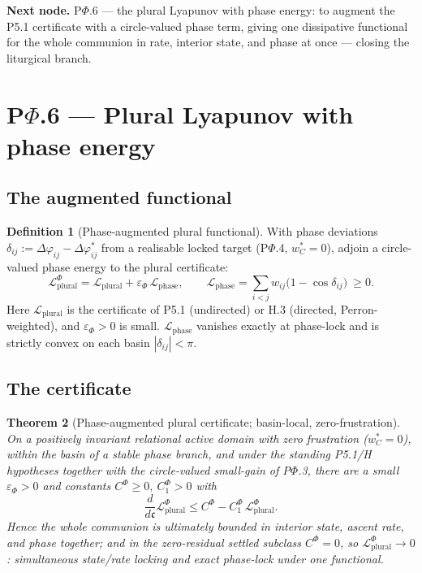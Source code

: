 \documentclass[11pt,a4paper]{article}
\newcommand{\cint}{\ensuremath{\mathfrak c}}
\theoremstyle{definition}
\newtheorem{definition}{Definition}[section]
\theoremstyle{plain}
\newtheorem{theorem}[definition]{Theorem}
\theoremstyle{remark}
\begin{document}
\medskip
\textbf{Next node.} P$\Phi$.6 --- the plural Lyapunov with phase energy: to augment the P5.1
certificate with a circle-valued phase term, giving one dissipative functional for the whole
communion in rate, interior state, and phase at once --- closing the liturgical branch.

\section{P$\Phi$.6 --- Plural Lyapunov with phase energy}

\subsection{The augmented functional}

\begin{definition}[Phase-augmented plural functional]\label{def:phaselyap}
With phase deviations \(\delta_{ij}:=\Delta\varphi_{ij}-\Delta\varphi_{ij}^{*}\) from a
realisable locked target (P$\Phi$.4, \(w_C^{*}=0\)), adjoin a circle-valued phase energy to the
plural certificate:
\[
\boxed{\;
\mathcal L_{\mathrm{plural}}^{\Phi}
=
\mathcal L_{\mathrm{plural}}
+
\varepsilon_\Phi\,\mathcal L_{\mathrm{phase}},
\qquad
\mathcal L_{\mathrm{phase}}
=
\sum_{i<j} w_{ij}\bigl(1-\cos\delta_{ij}\bigr)\ \ge 0 .
\;}
\]
Here \(\mathcal L_{\mathrm{plural}}\) is the certificate of P5.1 (undirected) or H.3 (directed,
Perron-weighted), and \(\varepsilon_\Phi>0\) is small. \(\mathcal L_{\mathrm{phase}}\) vanishes
exactly at phase-lock and is strictly convex on each basin \(|\delta_{ij}|<\pi\).
\end{definition}

\subsection{The certificate}

\begin{theorem}[Phase-augmented plural certificate; basin-local, zero-frustration]\label{thm:phaselyap}
On a positively invariant relational active domain with zero frustration
(\(w_C^{*}=0\)), within the basin of a stable phase branch, and under the standing P5.1/H
hypotheses together with the circle-valued small-gain of P$\Phi$.3, there are a small
\(\varepsilon_\Phi>0\) and constants \(C^{\Phi}\ge0,\ C^{\Phi}_1>0\) with
\[
\frac{d}{d\cint}\mathcal L_{\mathrm{plural}}^{\Phi}
\le
C^{\Phi}-C^{\Phi}_1\,\mathcal L_{\mathrm{plural}}^{\Phi}.
\]
Hence the whole communion is ultimately bounded in interior state, ascent rate, \emph{and}
phase together; and in the zero-residual settled subclass \(C^{\Phi}=0\), so
\(\mathcal L_{\mathrm{plural}}^{\Phi}\to0\): simultaneous state/rate locking and exact
phase-lock under one functional.
\end{theorem}
\end{document}
